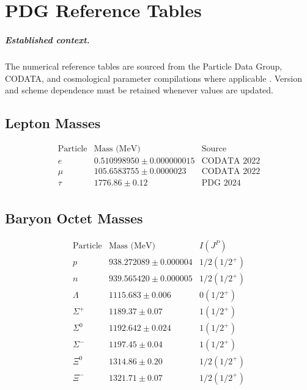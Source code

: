 \chapter{PDG Reference Tables}
\label{app:pdg_tables}


\paragraph{Established context.}
The numerical reference tables are sourced from the Particle Data Group, CODATA,
and cosmological parameter compilations where applicable
\cite{PDG2024,CODATA2022,Planck2018}.  Version and scheme dependence must be
retained whenever values are updated.

\section{Lepton Masses}

\[
\begin{array}{ccc}
\text{Particle} & \text{Mass (MeV)} & \text{Source} \\
\hline
e & 0.510998950 \pm 0.000000015 & \text{CODATA 2022} \\
\mu & 105.6583755 \pm 0.0000023 & \text{CODATA 2022} \\
\tau & 1776.86 \pm 0.12 & \text{PDG 2024} \\
\end{array}
\]

\section{Baryon Octet Masses}

\[
\begin{array}{ccc}
\text{Particle} & \text{Mass (MeV)} & I(J^P) \\
\hline
p & 938.272089 \pm 0.000004 & 1/2(1/2^+) \\
n & 939.565420 \pm 0.000005 & 1/2(1/2^+) \\
\Lambda & 1115.683 \pm 0.006 & 0(1/2^+) \\
\Sigma^+ & 1189.37 \pm 0.07 & 1(1/2^+) \\
\Sigma^0 & 1192.642 \pm 0.024 & 1(1/2^+) \\
\Sigma^- & 1197.45 \pm 0.04 & 1(1/2^+) \\
\Xi^0 & 1314.86 \pm 0.20 & 1/2(1/2^+) \\
\Xi^- & 1321.71 \pm 0.07 & 1/2(1/2^+) \\
\end{array}
\]

